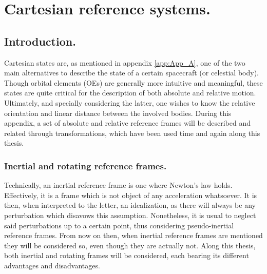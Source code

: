 \chapter{Cartesian reference systems.}
%
\label{app:App_B}
%
\section{Introduction.}
%
\indent Cartesian states are, as mentioned in appendix \ref{app:App_A}, one of the two main alternatives to describe the state of a certain spacecraft (or celestial body). Though orbital elements (OEs) are generally more intuitive and meaningful, these states are quite critical for the description of both absolute and relative motion. Ultimately, and specially considering the latter, one wishes to know the relative orientation and linear distance between the involved bodies. During this appendix, a set of absolute and relative reference frames will be described and related through transformations, which have been used time and again along this thesis.
%
	\subsection{Inertial and rotating reference frames.}
	\indent Technically, an inertial reference frame is one where Newton's law holds. Effectively, it is a frame which is not object of any acceleration whatsoever. It is then, when interpreted to the letter, an idealization, as there will always be any perturbation which disavows this assumption. Nonetheless, it is usual to neglect said perturbations up to a certain point, thus considering pseudo-inertial reference frames. From now on then, when inertial reference frames are mentioned they will be considered so, even though they are actually not. Along this thesis, both inertial and rotating frames will be considered, each bearing its different advantages and disadvantages.
